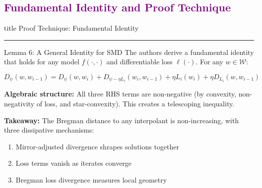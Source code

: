 \documentclass[aspectratio=169]{beamer}
\begin{document}
\subsection{\textbf{\textcolor{purple}{Fundamental Identity and Proof Technique}}}
\begin{frame}[plain]
    \vfill
    \centering
    \begin{beamercolorbox}[sep=8pt,center,shadow=true,rounded=true]{title}
        Proof Technique: Fundamental Identity\par%
        \color{oxfordblue}\noindent\rule{10cm}{1pt}
    \end{beamercolorbox}
    \vfill
\end{frame}

\begin{frame}{Lemma 6: A General Identity for SMD}
    The authors derive a fundamental identity that holds for any model $f(\cdot, \cdot)$ and differentiable loss $\ell(\cdot)$. For any $w \in \mathcal{W}$:
    
    \begin{equation}
        D_\psi(w, w_{i-1}) = D_\psi(w, w_i) + D_{\psi - \eta L_i}(w_i, w_{i-1}) + \eta L_i(w_i) + \eta D_{L_i}(w, w_{i-1})
    \end{equation}
    
    \textbf{Algebraic structure:} All three RHS terms are non-negative (by convexity, non-negativity of loss, and star-convexity). This creates a telescoping inequality.
    
    \vspace{0.1cm}
    \textbf{Takeaway:} The Bregman distance to any interpolant is non-increasing, with three dissipative mechanisms:
    \begin{enumerate}
        \item Mirror-adjusted divergence shrapes solutions together
        \item Loss terms vanish as iterates converge
        \item Bregman loss divergence measures local geometry
    \end{enumerate}
\end{frame}
\end{document}
